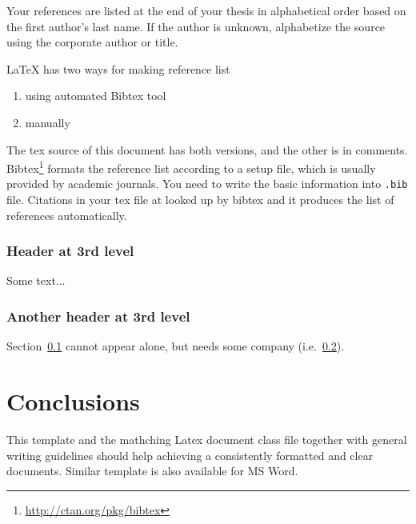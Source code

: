 \documentclass[12pt,a4paper,english
]{tunithesis}
\begin{document}
Your references are listed at the end of your thesis in alphabetical
order based on the first author's last name. If the author is unknown,
alphabetize the source using the corporate author or title.


LaTeX has two ways for making reference list
\begin{enumerate}
\item using automated Bibtex tool
\item manually
\end{enumerate}

The tex source of this document has both versions, and the other is in
comments. Bibtex\footnote{\url{http://ctan.org/pkg/bibtex}} formats the
reference list according to a setup file, which is usually provided by
academic journals. You need to write the basic information into
\texttt{.bib} file. Citations in your tex file at looked up by bibtex
and it produces the list of references automatically.

\subsection{Header at 3rd level}
\label{sec:3rd}
Some text...

\subsection{Another header at 3rd level}
\label{sec:3rd_partner}

Section~\ref{sec:3rd} cannot appear alone, but needs some company
(i.e.~\ref{sec:3rd_partner}).





\chapter{Conclusions}
\label{ch:concl}
This template and the mathching Latex document class file together
with general writing guidelines should help achieving a consistently
formatted and clear documents. Similar template is also available for
MS Word.
\end{document}
